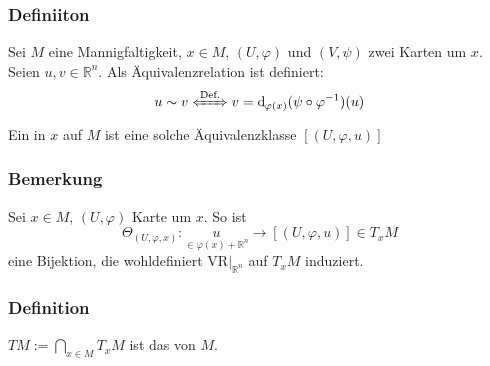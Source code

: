 \subsubsection{Definiiton}
\label{ssub:153}
Sei $M$ eine Mannigfaltigkeit, $x\in M$, $(U,\varphi)$ und $(V,\psi)$ zwei Karten um $x$. Seien $u,v\in \mathds{R}^n$. Als Äquivalenzrelation ist definiert:
\[
u \sim v \xLeftrightarrow{\text{Def.}} v = \mathd_{\varphi(x)}(\psi \circ \varphi^{-1})(u)
\]
Ein  in $x$ auf $M$ ist eine solche Äquivalenzklasse $[(U,\varphi,u)]$
\missingfigure{}

\subsubsection{Bemerkung}
\label{ssub:154}
Sei $x\in M$, $(U,\varphi)$ Karte um $x$. So ist
\[
\Theta_{(U,\varphi,x)}: \underset{\in \varphi(x) + \mathds{R}^n}{u} \to [(U,\varphi,u)]\in T_x M
\]
eine Bijektion, die wohldefiniert $\text{VR}\vert_{\mathds{R}^n}$ auf $T_x M$ induziert.

\subsubsection{Definition}
\label{ssub:155}
$TM := \bigcap_{x\in M} T_x M$ ist das  von $M$.




\cleardoubleoddemptypage
{}
\setcounter{page}{1}
\printindex
\listoffigures


